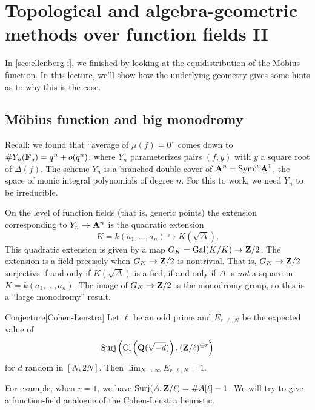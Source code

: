 
\section{Topological and algebra-geometric methods over function fields II}\label{sec:ellenberg-ii}





In \autoref{sec:ellenberg-i}, we finished by looking at the equidistribution of 
the M\"obius function. In this lecture, we'll show how the underlying geometry 
gives some hints as to why this is the case. 





\subsection{M\"obius function and big monodromy}

Recall: we found that ``average of $\mu(f)=0$'' comes down to 
$\# Y_n(\mathbf{F}_q) = q^n+o(q^n)$, where $Y_n$ parameterizes pairs $(f,y)$ with $y$ 
a square root of $\Delta(f)$. The scheme $Y_n$ is a branched double cover of 
$\mathbf{A}^n=\operatorname{Sym}^n\mathbf{A}^1$, the space of monic integral polynomials of degree 
$n$.  For this to work, we need $Y_n$ to be irreducible. 

On the level of function fields (that is, generic points) the extension 
corresponding to $Y_n \to \mathbf{A}^n$ is the quadratic extension 
\[
  K = k(a_1,\dots,a_n) \hookrightarrow K(\sqrt\Delta) .
\]
This quadratic extension is given by a map $G_K=\operatorname{Gal}(\bar K/K)\to \mathbf{Z}/2$. 
The extension is a field precisely when $G_K\to \mathbf{Z}/2$ is nontrivial. That is, 
$G_K\to \mathbf{Z}/2$ surjectivs if and only if $K(\sqrt\Delta)$ is a fied, if and 
only if $\Delta$ is \emph{not} a square in $K=k(a_1,\dots,a_n)$. The image of 
$G_K\to \mathbf{Z}/2$ is the monodromy group, so this is a ``large monodromy'' result. 

\begin{enonce}{Conjecture}[Cohen-Lenstra]
Let $\ell$ be an odd prime and $E_{r,\ell,N}$ be the expected value of 
\[
  \operatorname{Surj}\left(\operatorname{Cl}\left(\mathbf{Q}(\sqrt{-d})\right), (\mathbf{Z}/\ell)^{\oplus r}\right) 
\]
for $d$ random in $[N,2 N]$. Then $\lim_{N\to\infty} E_{r,\ell,N} = 1$. 
\end{enonce}

For example, when $r=1$, we have $\operatorname{Surj}(A,\mathbf{Z}/\ell) = \#A[\ell]-1$. We 
will try to give a function-field analogue of the Cohen-Lenstra heuristic. 





